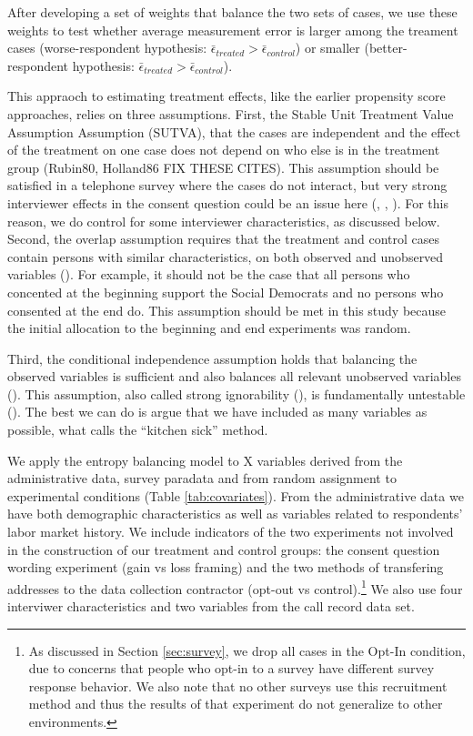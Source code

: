 After developing a set of weights that balance the two sets of cases, we use these weights to test whether average measurement error is larger among the treament cases (worse-respondent hypothesis: $\bar{\epsilon}_{treated} > \bar{\epsilon}_{control}$) or smaller (better-respondent hypothesis: $\bar{\epsilon}_{treated} > \bar{\epsilon}_{control}$).

This appraoch to estimating treatment effects, like the earlier propensity score approaches, relies on three assumptions. First, the Stable Unit Treatment Value Assumption  Assumption (SUTVA), that the cases are independent and the effect of the treatment on one case does not depend on who else is in the treatment group (Rubin80, Holland86 FIX THESE CITES). This assumption should be satisfied in a telephone survey where the cases do not interact, but very strong interviewer effects in the consent question could be an issue here (\cite{Beste11}, \cite{Sakshaugetal13}, \cite{Salaetal10}). For this reason, we do control for some interviewer characteristics, as discussed below. Second, the overlap assumption requires that the treatment and control cases contain persons with similar characteristics, on both observed and unobserved variables (\cite{Heckmanetal98}). For example, it should not be the case that all persons who concented at the beginning support the Social Democrats and no persons who consented at the end do. This assumption should be met in this study because the initial allocation to the beginning and end experiments was random. 

Third, the conditional independence assumption holds that balancing the observed variables is sufficient and also balances all relevant unobserved variables (\cite{Imbens14}). This assumption, also called strong ignorability (\cite{Stuart10}), is fundamentally untestable (\cite{Imbens04}). The best we can do is argue that we have included as many variables as possible, what \cite{Stuart10} calls the ``kitchen sick'' method.

We apply the entropy balancing model to X variables derived from the administrative data, survey paradata and from random assignment to experimental conditions (Table \ref{tab:covariates}). From the administrative data we have both demographic characteristics as well as  variables related to respondents' labor market history. We include indicators of the two experiments not involved in the construction of our treatment and control groups: the consent question wording experiment (gain vs loss framing) and the two methods of transfering addresses to the data collection contractor (opt-out vs control).\footnote{As discussed in Section \ref{sec:survey}, we drop all cases in the Opt-In condition, due to concerns that people who opt-in to a survey have different survey response behavior. We also note that no other surveys use this recruitment method and thus the results of that experiment do not generalize to other environments.} We also use four interviwer characteristics and two variables from the call record data set. 

